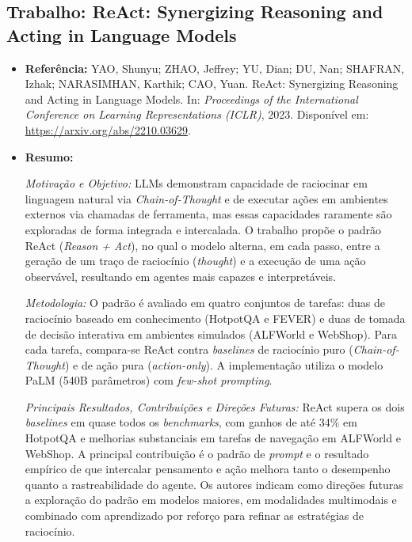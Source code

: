 \documentclass[12pt, a4paper]{article}
\begin{document}
\subsection{Trabalho: ReAct: Synergizing Reasoning and Acting in Language Models}

\begin{itemize}

  \item \textbf{Referência:}
  YAO, Shunyu; ZHAO, Jeffrey; YU, Dian; DU, Nan; SHAFRAN, Izhak; NARASIMHAN, Karthik; CAO, Yuan.
  ReAct: Synergizing Reasoning and Acting in Language Models.
  In: \textit{Proceedings of the International Conference on Learning Representations (ICLR)}, 2023.
  Disponível em: \url{https://arxiv.org/abs/2210.03629}.

  \item \textbf{Resumo:}

  \textit{Motivação e Objetivo:} LLMs demonstram capacidade de raciocinar em linguagem natural via \textit{Chain-of-Thought} e de executar ações em ambientes externos via chamadas de ferramenta, mas essas capacidades raramente são exploradas de forma integrada e intercalada.
  O trabalho propõe o padrão ReAct (\textit{Reason + Act}), no qual o modelo alterna, em cada passo, entre a geração de um traço de raciocínio (\textit{thought}) e a execução de uma ação observável, resultando em agentes mais capazes e interpretáveis.

  \textit{Metodologia:} O padrão é avaliado em quatro conjuntos de tarefas: duas de raciocínio baseado em conhecimento (HotpotQA e FEVER) e duas de tomada de decisão interativa em ambientes simulados (ALFWorld e WebShop).
  Para cada tarefa, compara-se ReAct contra \textit{baselines} de raciocínio puro (\textit{Chain-of-Thought}) e de ação pura (\textit{action-only}).
  A implementação utiliza o modelo PaLM (540B parâmetros) com \textit{few-shot prompting}.

  \textit{Principais Resultados, Contribuições e Direções Futuras:} ReAct supera os dois \textit{baselines} em quase todos os \textit{benchmarks}, com ganhos de até 34\% em HotpotQA e melhorias substanciais em tarefas de navegação em ALFWorld e WebShop.
  A principal contribuição é o padrão de \textit{prompt} e o resultado empírico de que intercalar pensamento e ação melhora tanto o desempenho quanto a rastreabilidade do agente.
  Os autores indicam como direções futuras a exploração do padrão em modelos maiores, em modalidades multimodais e combinado com aprendizado por reforço para refinar as estratégias de raciocínio.

\end{itemize}
\end{document}
